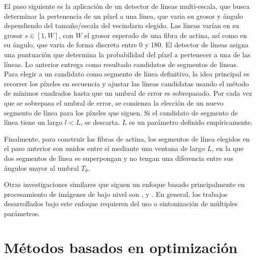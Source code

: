 El paso siguiente es la aplicaci\'on de un detector de l\'ineas multi-escala, que busca determinar la pertenencia de un p\'ixel a una l\'inea, que varia su grosor y \'angulo dependiendo del tama\~no/escala del vecindario elegido. Las l\'ineas var\'ian en su grosor $s \in [1,W]$, con $W$ el grosor esperado de una fibra de actina, as\'i como en su \'angulo, que varia de forma discreta entre 0 y 180\textdegree. El detector de l\'ineas asigna una puntuaci\'on que determina la probabilidad del p\'ixel a pertenecer a una de las l\'ineas. Lo anterior entrega como resultado candidatos de segmentos de l\'ineas. Para elegir a un candidato como segmento de l\'inea definitivo, la idea principal es recorrer los p\'ixeles en secuencia y ajustar las l\'ineas candidatas usando el m\'etodo de m\'inimos cuadrados hasta que un umbral de error es sobrepasado. Por cada vez que se sobrepasa el umbral de error, se comienza la elecci\'on de un nuevo segmento de l\'inea para los p\'ixeles que siguen. Si el candidato de segmento de l\'inea tiene un largo $l < L$, se descarta. $L$ es un par\'ametro definido emp\'iricamente.

Finalmente, para construir las fibras de actina, los segmentos de l\'inea elegidos en el paso anterior son unidos entre s\'i mediante una ventana de largo $L$, en la que dos segmentos de l\'inea se superpongan y no tengan una diferencia entre sus \'angulos mayor al umbral $T_{\theta}$. 

Otras investigaciones similares que siguen un enfoque basado principalmente en procesamiento de im\'agenes de bajo nivel son \citet{doi:10.1021/ma502264c},\citet{lichtenstein2003quantitative} y \citet{asgharzadeh2018computational}. En general, los trabajos desarrollados bajo este enfoque requieren del uso o sintonizaci\'on de m\'ultiples par\'ametros.




\section{M\'etodos basados en optimizaci\'on}
\label{sec:OptiMethods}

